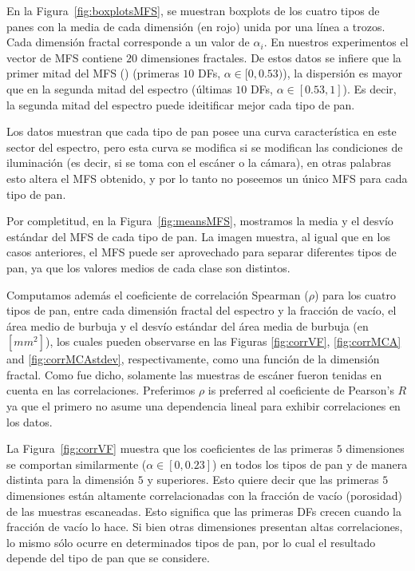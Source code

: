 \documentclass[spanish,a4paper,11pt,oneside,links]{report}
\begin{document}
En la Figura~\ref{fig:boxplotsMFS}, se muestran boxplots de los cuatro tipos de panes con la media de cada dimensión (en rojo) unida por una línea a trozos. Cada dimensión fractal corresponde a un valor de $\alpha_{i}$. En nuestros experimentos el vector de MFS contiene $20$ dimensiones fractales. De estos datos se infiere que la primer mitad del MFS () (primeras $10$ DFs, $\alpha \in [0,0.53)$), la dispersión es mayor que en la segunda mitad del espectro  (últimas $10$ DFs, $\alpha \in [0.53,1]$). Es decir, la segunda mitad del espectro puede ideitificar mejor cada tipo de pan.

Los datos muestran que cada tipo de pan posee una curva característica en este sector del espectro, pero esta curva se modifica si se modifican las condiciones de iluminación (es decir, si se toma con el escáner o la cámara), en otras palabras esto altera el MFS obtenido, y por lo tanto no poseemos un único MFS para cada tipo de pan. 

Por completitud, en la Figura~\ref{fig:meansMFS}, mostramos la media y el desvío estándar del MFS de cada tipo de pan. La imagen muestra, al igual que en los casos anteriores, el MFS puede ser aprovechado para separar diferentes tipos de pan, ya que los valores medios de cada clase son distintos.

Computamos además el coeficiente de correlación Spearman ($\rho$) para los cuatro tipos de pan, entre cada dimensión fractal del espectro y la fracción de vacío, el área medio de burbuja y el desvío estándar del área media de burbuja (en $[mm^{2}]$), los cuales pueden observarse en las Figuras \ref{fig:corrVF}, \ref{fig:corrMCA} and \ref{fig:corrMCAstdev}, respectivamente, como una función de la dimensión fractal. Como fue dicho, solamente las muestras de escáner fueron tenidas en cuenta en las correlaciones. Preferimos $\rho$ is preferred al coeficiente de Pearson's $R$ ya que el primero no asume una dependencia lineal para exhibir correlaciones en los datos.

La Figura~\ref{fig:corrVF} muestra que los coeficientes de las primeras $5$ dimensiones se comportan similarmente ($\alpha \in [0,0.23]$) en todos los tipos de pan y de manera distinta para la dimensión $5$ y superiores. Esto quiere decir que las primeras $5$ dimensiones están altamente correlacionadas con la fracción de vacío (porosidad) de las muestras escaneadas. Esto significa que las primeras DFs crecen cuando la fracción de vacío lo hace. Si bien otras dimensiones presentan altas correlaciones, lo mismo sólo ocurre en determinados tipos de pan, por lo cual el resultado depende del tipo de pan que se considere.
\end{document}
